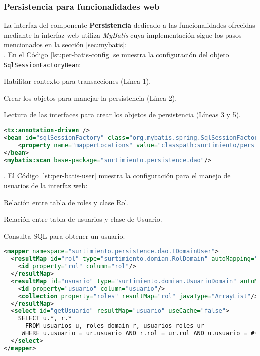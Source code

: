 \subsubsection{Persistencia para funcionalidades web}\label{sec:persistence-web}
La interfaz del componente \textbf{Persistencia} dedicado a las funcionalidades ofrecidas mediante la interfaz web utiliza \textit{MyBatis} cuya implementación sigue los pasos mencionados en la sección \ref{sec:mybatis}:\\
. En el Código \ref{lst:per-batis-config} se muestra la configuración del objeto \texttt{SqlSessionFactoryBean}: 
\begin{enumerate}
	{\setlength\itemindent{25pt}\item Habilitar contexto para transacciones (Línea 1).}
	{\setlength\itemindent{25pt}\item Crear los objetos para manejar la persistencia (Línea 2).}
	{\setlength\itemindent{25pt}\item Lectura de las interfaces para crear los objetos de persistencia (Líneas 3 y 5).}
\end{enumerate}

\pagebreak

\begin{lstlisting}[language=XML, caption={Configuración de \textit{MyBatis} con \textit{Spring}.}, captionpos=b, label={lst:per-batis-config}]
<tx:annotation-driven />
<bean id="sqlSessionFactory" class="org.mybatis.spring.SqlSessionFactoryBean">
	<property name="mapperLocations" value="classpath:surtimiento/persistence/dao/*.xml" />
</bean>
<mybatis:scan base-package="surtimiento.persistence.dao"/>
\end{lstlisting}

. El Código \ref{lst:per-batis-user} muestra la configuración para el manejo de usuarios de la interfaz web:
\begin{enumerate}
	{\setlength\itemindent{25pt}\item Relación entre tabla de roles y clase Rol.}
	{\setlength\itemindent{25pt}\item Relación entre tabla de usuarios y clase de Usuario.}
	{\setlength\itemindent{25pt}\item Consulta SQL para obtener un usuario.}
\end{enumerate}
\begin{lstlisting}[language=XML, caption={Definición de relación de \textit{MyBatis}.}, label={
lst:per-batis-user}]
<mapper namespace="surtimiento.persistence.dao.IDomainUser">
  <resultMap id="rol" type="surtimiento.domian.RolDomain" autoMapping="true">
    <id property="rol" column="rol"/>
  </resultMap>
  <resultMap id="usuario" type="surtimiento.domian.UsuarioDomain" autoMapping="true">
    <id property="usuario" column="usuario"/>
    <collection property="roles" resultMap="rol" javaType="ArrayList"/>
  </resultMap>
  <select id="getUsuario" resultMap="usuario" useCache="false">
    SELECT u.*, r.*
      FROM usuarios u, roles_domain r, usuarios_roles ur
     WHERE u.usuario = ur.usuario AND r.rol = ur.rol AND u.usuario = #{0};
  </select>
</mapper>
\end{lstlisting}

